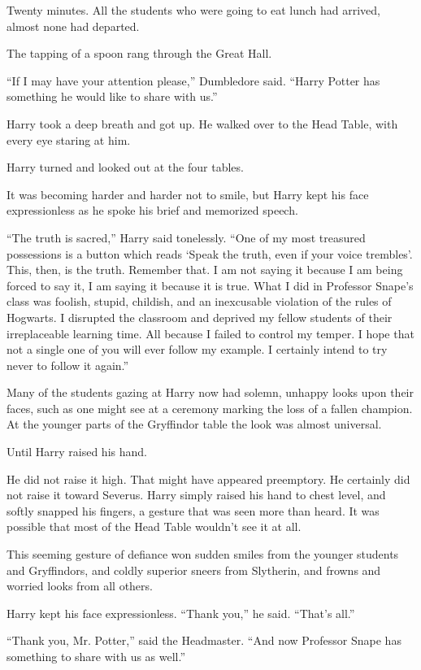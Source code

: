 Twenty minutes. All the students who were going to eat lunch had arrived, almost none had departed.

The tapping of a spoon rang through the Great Hall.

``If I may have your attention please,'' Dumbledore said. ``Harry Potter has something he would like to share with us.''

Harry took a deep breath and got up. He walked over to the Head Table, with every eye staring at him.

Harry turned and looked out at the four tables.

It was becoming harder and harder not to smile, but Harry kept his face expressionless as he spoke his brief and memorized speech.

``The truth is sacred,'' Harry said tonelessly. ``One of my most treasured possessions is a button which reads `Speak the truth, even if your voice trembles'. This, then, is the truth. Remember that. I am not saying it because I am being forced to say it, I am saying it because it is true. What I did in Professor Snape's class was foolish, stupid, childish, and an inexcusable violation of the rules of Hogwarts. I disrupted the classroom and deprived my fellow students of their irreplaceable learning time. All because I failed to control my temper. I hope that not a single one of you will ever follow my example. I certainly intend to try never to follow it again.''

Many of the students gazing at Harry now had solemn, unhappy looks upon their faces, such as one might see at a ceremony marking the loss of a fallen champion. At the younger parts of the Gryffindor table the look was almost universal.

Until Harry raised his hand.

He did not raise it high. That might have appeared preemptory. He certainly did not raise it toward Severus. Harry simply raised his hand to chest level, and softly snapped his fingers, a gesture that was seen more than heard. It was possible that most of the Head Table wouldn't see it at all.

This seeming gesture of defiance won sudden smiles from the younger students and Gryffindors, and coldly superior sneers from Slytherin, and frowns and worried looks from all others.

Harry kept his face expressionless. ``Thank you,'' he said. ``That's all.''

``Thank you, Mr. Potter,'' said the Headmaster. ``And now Professor Snape has something to share with us as well.''

